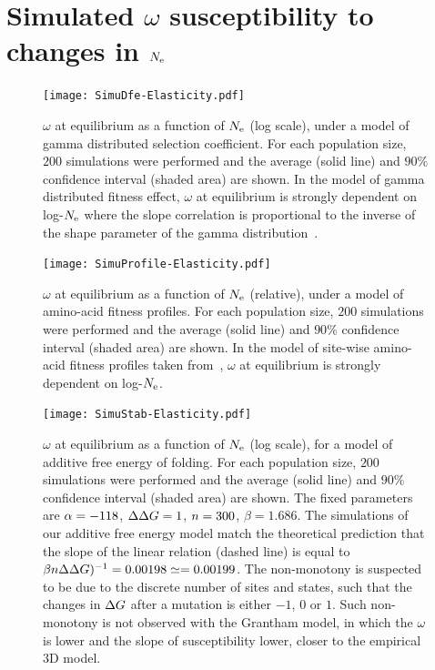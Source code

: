 \section{Simulated \texorpdfstring{$\omega$}{ω} susceptibility to changes in \texorpdfstring{$N_{\text{e}}$}{Nₑ}}
\label{sec:simulated-omega-susceptibility-to-changes-Ne}

\begin{figure}[H]
    \centering
    \texttt{[image: SimuDfe-Elasticity.pdf]}
    \caption[$\omega$ susceptibility with gamma distributed selection coefficient]{
    $\omega$ at equilibrium as a function of $N_{\text{e}}$ (log scale), under a model of gamma distributed selection coefficient.
    For each population size, $200$ simulations were performed and the average (solid line) and $90\%$ confidence interval (shaded area) are shown.
    In the model of gamma distributed fitness effect, $\omega$ at equilibrium is strongly dependent on log-$N_{\text{e}}$ where the slope correlation is proportional to the inverse of the shape parameter of the gamma distribution~\citep{Welch2008}.
    }
\end{figure}

\begin{figure}[H]
    \centering
    \texttt{[image: SimuProfile-Elasticity.pdf]}
    \caption[$\omega$ susceptibility with amino-acid fitness profiles]{
    $\omega$ at equilibrium as a function of $N_{\text{e}}$ (relative), under a model of amino-acid fitness profiles.
    For each population size, $200$ simulations were performed and the average (solid line) and $90\%$ confidence interval (shaded area) are shown.
    In the model of site-wise amino-acid fitness profiles taken from~\citep{Bloom2017}, $\omega$ at equilibrium is strongly dependent on log-$N_{\text{e}}$.
    }
\end{figure}

\begin{figure}[H]
    \centering
    \texttt{[image: SimuStab-Elasticity.pdf]}
    \caption[$\omega$ susceptibility with additive free energy of folding]{
    $\omega$ at equilibrium as a function of $N_{\text{e}}$ (log scale), for a model of additive free energy of folding.
    For each population size, $200$ simulations were performed and the average (solid line) and $90\%$ confidence interval (shaded area) are shown.
    The fixed parameters are $\alpha=-118$, $\Delta \Delta G=1$, $n=300$, $\beta=1.686$.
    The simulations of our additive free energy model match the theoretical prediction that the slope of the linear relation (dashed line) is equal to $\beta n \Delta \Delta G)^{-1} = 0.00198 \simeq = 0.00199$.
    The non-monotony is suspected to be due to the discrete number of sites and states, such that the changes in $\Delta G$ after a mutation is either $-1$, $0$ or $1$. Such non-monotony is not observed with the Grantham model, in which the $\omega$ is lower and the slope of susceptibility lower, closer to the empirical 3D model.
    }
\end{figure}

